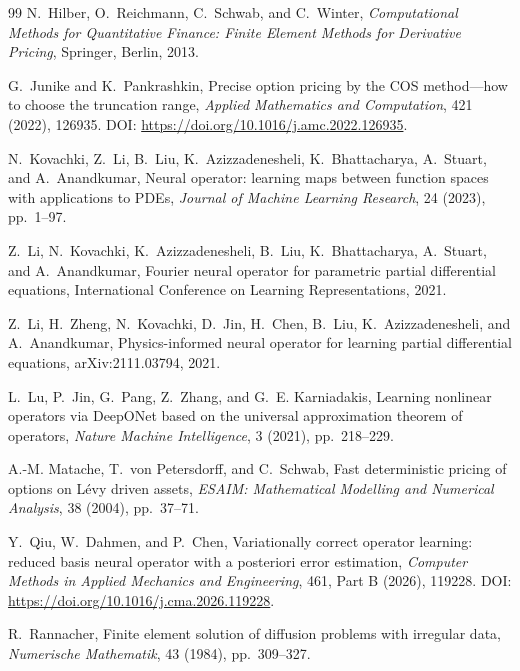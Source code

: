 \documentclass[11pt]{amsart}
\theoremstyle{remark}
\begin{document}
\begin{thebibliography}{99}
N.~Hilber, O.~Reichmann, C.~Schwab, and C.~Winter,
\newblock \emph{Computational Methods for Quantitative Finance: Finite Element
Methods for Derivative Pricing},
\newblock Springer, Berlin, 2013.

G.~Junike and K.~Pankrashkin,
\newblock Precise option pricing by the COS method---how to choose the
truncation range,
\newblock \emph{Applied Mathematics and Computation}, 421 (2022), 126935.
DOI: \url{https://doi.org/10.1016/j.amc.2022.126935}.

N.~Kovachki, Z.~Li, B.~Liu, K.~Azizzadenesheli, K.~Bhattacharya, A.~Stuart,
and A.~Anandkumar,
\newblock Neural operator: learning maps between function spaces with
applications to PDEs,
\newblock \emph{Journal of Machine Learning Research}, 24 (2023), pp.~1--97.

Z.~Li, N.~Kovachki, K.~Azizzadenesheli, B.~Liu, K.~Bhattacharya, A.~Stuart,
and A.~Anandkumar,
\newblock Fourier neural operator for parametric partial differential
equations,
\newblock International Conference on Learning Representations, 2021.

Z.~Li, H.~Zheng, N.~Kovachki, D.~Jin, H.~Chen, B.~Liu, K.~Azizzadenesheli,
and A.~Anandkumar,
\newblock Physics-informed neural operator for learning partial differential
equations,
\newblock arXiv:2111.03794, 2021.

L.~Lu, P.~Jin, G.~Pang, Z.~Zhang, and G.~E. Karniadakis,
\newblock Learning nonlinear operators via DeepONet based on the universal
approximation theorem of operators,
\newblock \emph{Nature Machine Intelligence}, 3 (2021), pp.~218--229.

A.-M. Matache, T.~von Petersdorff, and C.~Schwab,
\newblock Fast deterministic pricing of options on L\'evy driven assets,
\newblock \emph{ESAIM: Mathematical Modelling and Numerical Analysis},
38 (2004), pp.~37--71.

Y.~Qiu, W.~Dahmen, and P.~Chen,
\newblock Variationally correct operator learning: reduced basis neural
operator with a posteriori error estimation,
\newblock \emph{Computer Methods in Applied Mechanics and Engineering},
461, Part B (2026), 119228.
DOI: \url{https://doi.org/10.1016/j.cma.2026.119228}.

R.~Rannacher,
\newblock Finite element solution of diffusion problems with irregular data,
\newblock \emph{Numerische Mathematik}, 43 (1984), pp.~309--327.


\end{thebibliography}
\end{document}
